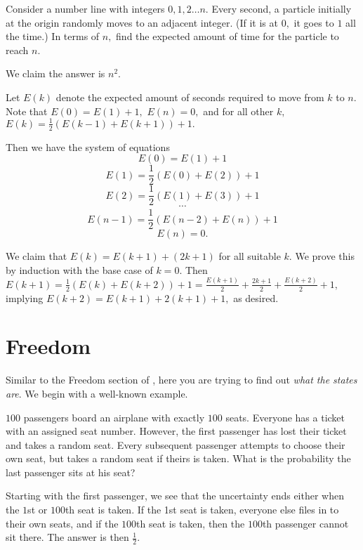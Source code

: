 \documentclass[blue,onecol]{shooting}
\begin{document}
\begin{exam}
Consider a number line with integers $0,1,2\dots n.$ Every second, a particle initially at the origin randomly moves to an adjacent integer. (If it is at $0,$ it goes to $1$ all the time.) In terms of $n,$ find the expected amount of time for the particle to reach $n.$
\end{exam}

\begin{sol}
We claim the answer is $n^2.$
    
    Let $E(k)$ denote the expected amount of seconds required to move from $k$ to $n.$ Note that $E(0)=E(1)+1,$ $E(n)=0,$ and for all other $k,$ $E(k)=\frac{1}{2}(E(k-1)+E(k+1))+1.$
    
    Then we have the system of equations
    $$E(0)=E(1)+1$$
    $$E(1)=\frac{1}{2}(E(0)+E(2))+1$$
    $$E(2)=\frac{1}{2}(E(1)+E(3))+1$$
    $$\cdots$$
    $$E(n-1)=\frac{1}{2}(E(n-2)+E(n))+1$$
    $$E(n)=0.$$
    
    We claim that $E(k)=E(k+1)+(2k+1)$ for all suitable $k.$ We prove this by induction with the base case of $k=0.$ Then $E(k+1)=\frac{1}{2}(E(k)+E(k+2))+1=\frac{E(k+1)}{2}+\frac{2k+1}{2}+\frac{E(k+2)}{2}+1,$ implying $E(k+2)=E(k+1)+2(k+1)+1,$ as desired.
\end{sol}

\section{Freedom}

Similar to the Freedom section of , here you are trying to find out \textit{what the states are}. We begin with a well-known example.

\begin{exam}
$100$ passengers board an airplane with exactly $100$ seats. Everyone has a ticket with an assigned seat number. However, the first passenger has lost their ticket and takes a random seat. Every subsequent passenger attempts to choose their own seat, but takes a random seat if theirs is taken. What is the probability the last passenger sits at his seat?
\end{exam}

\begin{sol}
Starting with the first passenger, we see that the uncertainty ends either when the $1$st or $100$th seat is taken. If the 1st seat is taken, everyone else files in to their own seats, and if the $100$th seat is taken, then the $100$th passenger cannot sit there. The answer is then $\frac{1}{2}.$
\end{sol}
\end{document}
